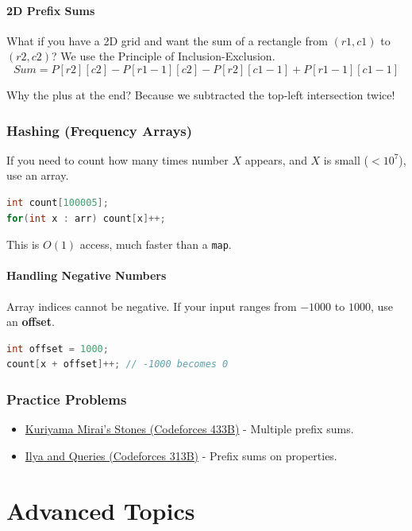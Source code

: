 \documentclass[12pt, a4paper]{report}
\begin{document}
\subsection{2D Prefix Sums}
What if you have a 2D grid and want the sum of a rectangle from $(r1, c1)$ to $(r2, c2)$?
We use the Principle of Inclusion-Exclusion.
\[ Sum = P[r2][c2] - P[r1-1][c2] - P[r2][c1-1] + P[r1-1][c1-1] \]
\begin{thinkbox}
Why the plus at the end? Because we subtracted the top-left intersection twice!
\end{thinkbox}

\section{Hashing (Frequency Arrays)}
If you need to count how many times number $X$ appears, and $X$ is small ($< 10^7$), use an array.
\begin{lstlisting}[language=C++]
int count[100005];
for(int x : arr) count[x]++;
\end{lstlisting}
This is $O(1)$ access, much faster than a \texttt{map}.

\subsection{Handling Negative Numbers}
Array indices cannot be negative. If your input ranges from $-1000$ to $1000$, use an \textbf{offset}.
\begin{lstlisting}[language=C++]
int offset = 1000;
count[x + offset]++; // -1000 becomes 0
\end{lstlisting}

\section{Practice Problems}
\begin{itemize}
    \item \href{https://codeforces.com/problemset/problem/433/B}{Kuriyama Mirai's Stones (Codeforces 433B)} - Multiple prefix sums.
    \item \href{https://codeforces.com/problemset/problem/313/B}{Ilya and Queries (Codeforces 313B)} - Prefix sums on properties.
\end{itemize}

\part{Advanced Topics}
\end{document}
